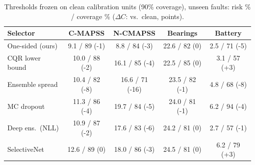 \begin{table}[t]
\centering
\footnotesize
\setlength{\tabcolsep}{3pt}
\begin{tabular}{lcccc}
\hline
Selector & C-MAPSS & N-CMAPSS & Bearings & Battery\\
\hline
One-sided (ours) & 9.1 / 89 (-1) & 8.8 / 84 (-3) & 22.6 / 82 (0) & 2.5 / 71 (-5)\\
CQR lower bound & 10.0 / 88 (-2) & 16.1 / 85 (-4) & 22.5 / 85 (0) & 3.1 / 57 (+3)\\
Ensemble spread & 10.4 / 82 (-8) & 16.6 / 71 (-16) & 23.5 / 82 (-1) & 4.8 / 68 (-8)\\
MC dropout & 11.3 / 86 (-4) & 19.7 / 84 (-5) & 24.0 / 81 (-1) & 6.2 / 94 (-4)\\
Deep ens.\ (NLL) & 10.9 / 87 (-2) & 17.6 / 83 (-6) & 24.2 / 81 (0) & 2.7 / 57 (-1)\\
SelectiveNet & 12.6 / 89 (0) & 18.0 / 86 (-3) & 24.5 / 81 (0) & 6.2 / 79 (+3)\\
\hline
\end{tabular}
\caption{Thresholds frozen on clean calibration units (90\% coverage), unseen faults: risk \% / coverage \% ($\Delta C$: vs.\ clean, points).}
\label{tab:frozen}
\end{table}
